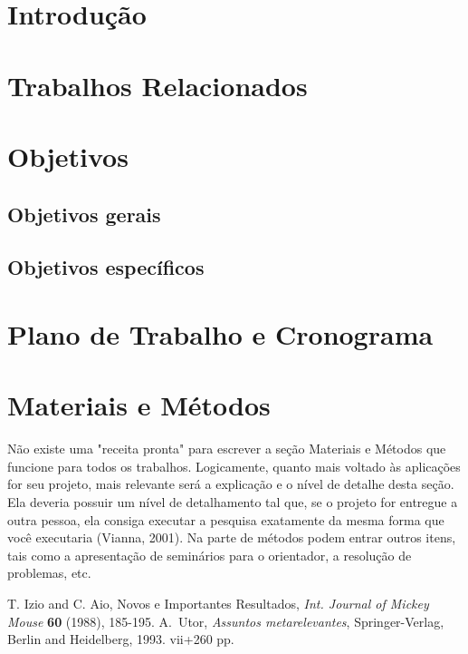 \documentclass[12pt,a4paper]{article}
\begin{document}
\noindent{}
\newpage
\pagestyle{empty}
\tableofcontents
\newpage
\setcounter{page}{1}
\pagestyle{plain}

\section{Introdução}
\label{section:introducao}

\section{Trabalhos Relacionados}
\label{section:trabrelacionados}

\section{Objetivos}
\label{section:objetivos}
\subsection{Objetivos gerais}

\subsection{Objetivos específicos}

\section{Plano de Trabalho e Cronograma} 

\section{Materiais e Métodos}
\label{section:materiais}
Não existe uma "receita pronta" para escrever a seção Materiais e Métodos que funcione para todos os trabalhos. Logicamente, quanto mais voltado às aplicações for seu projeto, mais relevante será a explicação e o nível de detalhe desta seção. Ela deveria possuir um nível de detalhamento tal que, se o projeto for entregue a outra pessoa, ela consiga executar a pesquisa exatamente da mesma forma que você executaria (Vianna, 2001). Na parte de métodos podem entrar outros itens, tais como a apresentação de seminários para o orientador, a resolução de problemas, etc. 

\newpage

\begin{thebibliography}{99}
 T. Izio and C. Aio, Novos e Importantes Resultados, \emph{Int. Journal of Mickey Mouse} {\bf 60}  (1988), 185-195.
 A.~Utor,  \emph{Assuntos metarelevantes}, Springer-Verlag, Berlin and Heidelberg, 1993. vii+260 pp.
\end{thebibliography}
\end{document}
